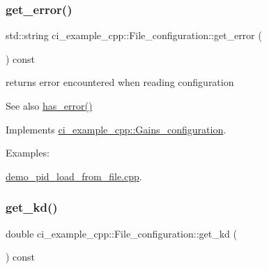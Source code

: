 \subsubsection{\texorpdfstring{get\+\_\+error()}{get\_error()}}
{\footnotesize\ttfamily std\+::string ci\+\_\+example\+\_\+cpp\+::\+File\+\_\+configuration\+::get\+\_\+error (\begin{DoxyParamCaption}{ }\end{DoxyParamCaption}) const\hspace{0.3cm}{\ttfamily [virtual]}}



returns error encountered when reading configuration 

\begin{DoxySeeAlso}{See also}
\hyperlink{classci__example__cpp_1_1File__configuration_aa3cae137be3b59e61d13c2a9b1ec8b6a}{has\+\_\+error()} 
\end{DoxySeeAlso}


Implements \hyperlink{classci__example__cpp_1_1Gains__configuration_a886100ef46082d1b9f8ee169318dc554}{ci\+\_\+example\+\_\+cpp\+::\+Gains\+\_\+configuration}.

\begin{Desc}
\item[Examples\+: ]\par
\hyperlink{demo_pid_load_from_file_8cpp-example}{demo\+\_\+pid\+\_\+load\+\_\+from\+\_\+file.\+cpp}.\end{Desc}
\mbox{\label{classci__example__cpp_1_1File__configuration_a14b1e36766d55ee0132a78fbc41f8096}} 
\subsubsection{\texorpdfstring{get\+\_\+kd()}{get\_kd()}}
{\footnotesize\ttfamily double ci\+\_\+example\+\_\+cpp\+::\+File\+\_\+configuration\+::get\+\_\+kd (\begin{DoxyParamCaption}{ }\end{DoxyParamCaption}) const\hspace{0.3cm}{\ttfamily [virtual]}}



